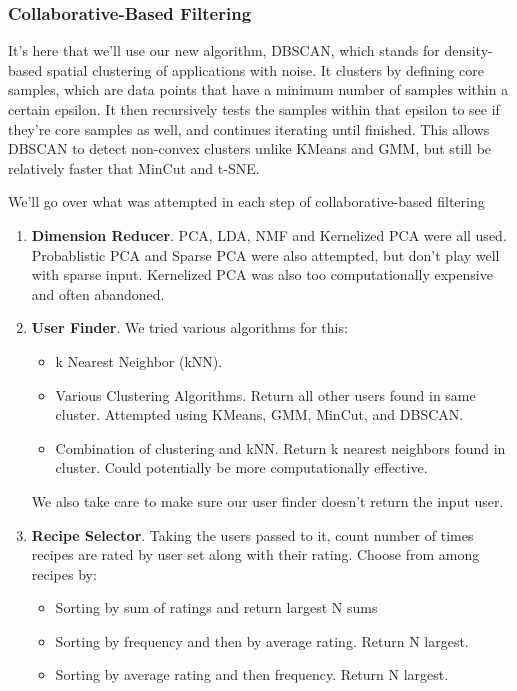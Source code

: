 \documentclass[11pt]{article}
\begin{document}
\subsubsection{Collaborative-Based Filtering}

It's here that we'll use our new algorithm, DBSCAN, which stands for density-based spatial clustering of applications with noise. It clusters by defining core samples, which are data points that have a minimum number of samples within a certain epsilon. It then recursively tests the samples within that epsilon to see if they're core samples as well, and continues iterating until finished. This allows DBSCAN to detect non-convex clusters unlike KMeans and GMM, but still be relatively faster that MinCut and t-SNE.

We'll go over what was attempted in each step of collaborative-based filtering
\begin{enumerate}
    \item \textbf{Dimension Reducer}. PCA, LDA, NMF and Kernelized PCA were all used. Probablistic PCA and Sparse PCA were also attempted, but don't play well with sparse input. Kernelized PCA was also too computationally expensive and often abandoned.
    \item \textbf{User Finder}. We tried various algorithms for this:
    \begin{itemize}
        \item k Nearest Neighbor (kNN).
        \item Various Clustering Algorithms. Return all other users found in same cluster. Attempted using KMeans, GMM, MinCut, and DBSCAN.
        \item Combination of clustering and kNN. Return k nearest neighbors found in cluster. Could potentially be more computationally effective.
    \end{itemize}
    We also take care to make sure our user finder doesn't return the input user.
    \item \textbf{Recipe Selector}. Taking the users passed to it, count number of times recipes are rated by user set along with their rating. Choose from among recipes by:
    \begin{itemize}
        \item Sorting by sum of ratings and return largest N sums
        \item Sorting by frequency and then by average rating. Return N largest.
        \item Sorting by average rating and then frequency. Return N largest.
    \end{itemize}
\end{enumerate}
\end{document}
